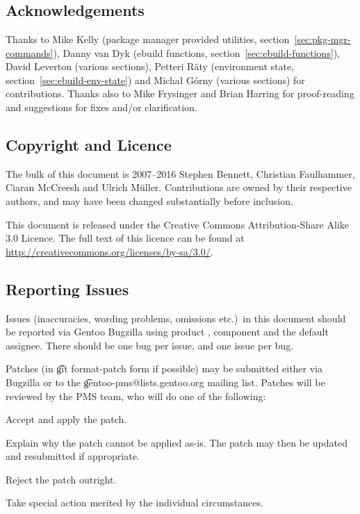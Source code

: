 \chapter*{}

\section*{Acknowledgements}

Thanks to Mike Kelly (package manager provided utilities, section~\ref{sec:pkg-mgr-commands}),
Danny van Dyk (ebuild functions, section~\ref{sec:ebuild-functions}), David Leverton (various
sections), Petteri Räty (environment state, section~\ref{sec:ebuild-env-state}) and Michał Górny
(various sections) for contributions. Thanks also to Mike Frysinger and Brian Harring for
proof-reading and suggestions for fixes and/or clarification.

\section*{Copyright and Licence}

The bulk of this document is \textcopyright{} 2007--2016 Stephen Bennett, Christian Faulhammer,
Ciaran McCreesh and Ulrich Müller. Contributions are owned by their respective authors, and may
have been changed substantially before inclusion.

This document is released under the Creative Commons Attribution-Share Alike 3.0 Licence. The full
text of this licence can be found at \url{http://creativecommons.org/licenses/by-sa/3.0/}.

\section*{Reporting Issues}

Issues (inaccuracies, wording problems, omissions etc.)\ in this document should be reported via
Gentoo Bugzilla using product , component  and the default
assignee. There should be one bug per issue, and one issue per bug.

Patches (in \t{git format-patch} form if possible) may be submitted either via Bugzilla or to the
\t{gentoo-pms@lists.gentoo.org} mailing list. Patches will be reviewed by the PMS team, who will do
one of the following:

\begin{compactitem}
\item Accept and apply the patch.
\item Explain why the patch cannot be applied as-is. The patch may then be updated and resubmitted
if appropriate.
\item Reject the patch outright.
\item Take special action merited by the individual circumstances.
\end{compactitem}

